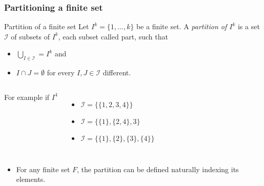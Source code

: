 \begin{frame}[t]
\frametitle{Partitioning a finite set}
\begin{block}{Partition of a finite set}
Let $I^k = \{1, \dots, k \}$ be a finite set. A \emph{partition of $I^k$}  is a set $\mathcal{I}$ of subsets of $I^k$, each subset  called part, such that 
\begin{itemize}
\item $\bigcup_{I \in \mathcal{I}} = I^k$ and 
\item $I \cap J = \emptyset$  for every $I, J \in \mathcal{I}$ different.
\end{itemize}
\end{block}

\medskip
\pause

\begin{columns}
%
For example if $I^4$
\begin{itemize}
\item $\mathcal{I} = \{ \{1, 2, 3, 4\} \}$
\item $\mathcal{I} = \{ \{1 \}, \{2, 4\}, 3 \}$
\item $\mathcal{I} = \{ \{1\}, \{2\}, \{3\}, \{4\} \}$
\end{itemize}
%
\end{columns}

\medskip
\pause
\begin{itemize}
\item[] For any finite set $F$, the partition can be defined naturally indexing its elements.
\end{itemize}
\end{frame}

